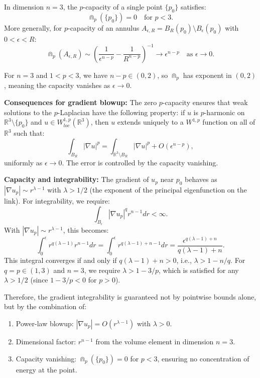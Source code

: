 \begin{lemma}\label{lem:CapacityFormula}
In dimension $n=3$, the $p$-capacity of a single point $\{p_0\}$ satisfies:
\begin{equation}\label{eq:CapacityPoint}
    \Cap_p(\{p_0\}) = 0 \quad \text{for } p < 3.
\end{equation}
More generally, for $p$-capacity of an annulus $A_{\epsilon,R} = B_R(p_0) \setminus B_\epsilon(p_0)$ with $0 < \epsilon < R$:
\begin{equation}\label{eq:CapacityAnnulus}
    \Cap_p(A_{\epsilon,R}) \sim \left(\frac{1}{\epsilon^{n-p}} - \frac{1}{R^{n-p}}\right)^{-1} \to \epsilon^{n-p} \quad \text{as } \epsilon \to 0.
\end{equation}

For $n = 3$ and $1 < p < 3$, we have $n - p \in (0, 2)$, so $\Cap_p$ has exponent in $(0,2)$, meaning the capacity vanishes as $\epsilon \to 0$.

\textbf{Consequences for gradient blowup:}
The zero $p$-capacity ensures that weak solutions to the $p$-Laplacian have the following property: if $u$ is $p$-harmonic on $\mathbb{R}^3 \setminus \{p_0\}$ and $u \in W^{1,p}_{loc}(\mathbb{R}^3)$, then $u$ extends uniquely to a $W^{1,p}$ function on all of $\mathbb{R}^3$ such that:
\begin{equation}
    \int_{B_R} |\nabla u|^p = \int_{\mathbb{R}^3 \setminus B_R} |\nabla u|^p + O(\epsilon^{n-p}),
\end{equation}
uniformly as $\epsilon \to 0$. The error is controlled by the capacity vanishing.

\textbf{Capacity and integrability:} The gradient of $u_p$ near $p_0$ behaves as $|\nabla u_p| \sim r^{\lambda-1}$ with $\lambda > 1/2$ (the exponent of the principal eigenfunction on the link). For integrability, we require:
\begin{equation}
    \int_{B_\epsilon} |\nabla u_p|^q r^{n-1} dr < \infty.
\end{equation}
With $|\nabla u_p| \sim r^{\lambda-1}$, this becomes:
\begin{equation}
    \int_0^\epsilon r^{q(\lambda-1)} r^{n-1} dr = \int_0^\epsilon r^{q(\lambda-1)+n-1} dr = \frac{\epsilon^{q(\lambda-1)+n}}{q(\lambda-1)+n}.
\end{equation}
This integral converges if and only if $q(\lambda-1)+n > 0$, i.e., $\lambda > 1 - n/q$. For $q = p \in (1, 3)$ and $n = 3$, we require $\lambda > 1 - 3/p$, which is satisfied for any $\lambda > 1/2$ (since $1 - 3/p < 0$ for $p > 0$).

Therefore, the gradient integrability is guaranteed not by pointwise bounds alone, but by the combination of:
\begin{enumerate}
    \item Power-law blowup: $|\nabla u_p| = O(r^{\lambda-1})$ with $\lambda > 0$.
    \item Dimensional factor: $r^{n-1}$ from the volume element in dimension $n=3$.
    \item Capacity vanishing: $\Cap_p(\{p_0\}) = 0$ for $p < 3$, ensuring no concentration of energy at the point.
\end{enumerate}
\end{lemma}

